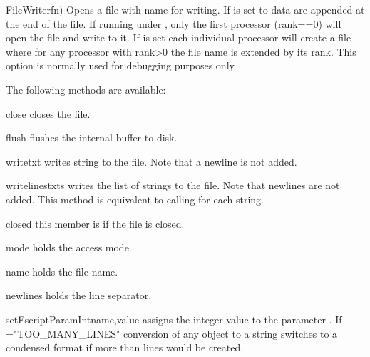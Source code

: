 \begin{classdesc}{FileWriter}{fn)}
Opens a file with name  for writing. If  is set to \True
data are appended at the end of the file.
If running under \MPI, only the first processor (rank==0) will open the file
and write to it.
If  is set each individual processor will create a file
where for any processor with rank>0 the file name is extended by its rank.
This option is normally used for debugging purposes only.
\end{classdesc}

\vspace{1em}\noindent The following methods are available:
\begin{methoddesc}[FileWriter]{close}{}
closes the file.
\end{methoddesc}
\begin{methoddesc}[FileWriter]{flush}{}
flushes the internal buffer to disk.
\end{methoddesc}
\begin{methoddesc}[FileWriter]{write}{txt}
writes string  to the file. Note that a newline is not added.
\end{methoddesc}
\begin{methoddesc}[FileWriter]{writelines}{txts}
writes the list  of strings to the file.
Note that newlines are not added.
This method is equivalent to calling  for each string.
\end{methoddesc}
\begin{memberdesc}[FileWriter]{closed}
this member is \True if the file is closed.
\end{memberdesc}
\begin{memberdesc}[FileWriter]{mode}
holds the access mode.
\end{memberdesc}
\begin{memberdesc}[FileWriter]{name}
holds the file name.
\end{memberdesc}
\begin{memberdesc}[FileWriter]{newlines}
holds the line separator.
\end{memberdesc}

\begin{funcdesc}{setEscriptParamInt}{name,value}
assigns the integer value  to the parameter .
If ="TOO_MANY_LINES" conversion of any \Data object to a string
switches to a condensed format if more than  lines would be created.
\end{funcdesc}


